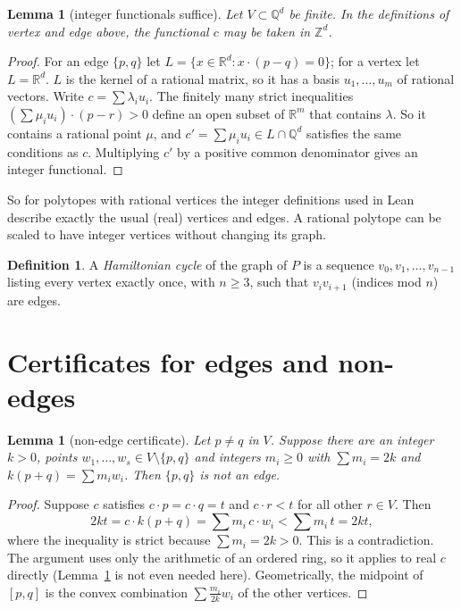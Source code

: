 \documentclass[11pt]{article}
\newtheorem{lemma}[theorem]{Lemma}
\theoremstyle{definition}
\newtheorem{definition}[theorem]{Definition}
\theoremstyle{remark}
\begin{document}
\begin{lemma}[integer functionals suffice]\label{lem:int}
Let $V\subset\mathbb{Q}^d$ be finite. In the definitions of vertex and edge above,
the functional $c$ may be taken in $\mathbb{Z}^d$.
\end{lemma}
\begin{proof}
For an edge $\{p,q\}$ let $L=\{x\in\mathbb{R}^d: x\cdot(p-q)=0\}$; for a vertex let
$L=\mathbb{R}^d$. $L$ is the kernel of a rational matrix, so it has a basis
$u_1,\dots,u_m$ of rational vectors. Write $c=\sum\lambda_iu_i$. The finitely many
strict inequalities $(\sum\mu_iu_i)\cdot(p-r)>0$ define an open subset of
$\mathbb{R}^m$ that contains $\lambda$. So it contains a rational point $\mu$, and
$c'=\sum\mu_iu_i\in L\cap\mathbb{Q}^d$ satisfies the same conditions as $c$.
Multiplying $c'$ by a positive common denominator gives an integer functional.
\end{proof}
So for polytopes with rational vertices the integer definitions used in Lean
describe exactly the usual (real) vertices and edges. A rational polytope can be
scaled to have integer vertices without changing its graph.

\begin{definition}
A \emph{Hamiltonian cycle} of the graph of $P$ is a sequence
$v_0,v_1,\dots,v_{n-1}$ listing every vertex exactly once, with $n\ge3$, such that
$v_i v_{i+1}$ (indices mod $n$) are edges.
\end{definition}

\section{Certificates for edges and non-edges}
\begin{lemma}[non-edge certificate]\label{lem:cert}
Let $p\ne q$ in $V$. Suppose there are an integer $k>0$, points
$w_1,\dots,w_s\in V\setminus\{p,q\}$ and integers $m_i\ge0$ with
$\sum m_i=2k$ and $k(p+q)=\sum m_iw_i$. Then $\{p,q\}$ is not an edge.
\end{lemma}
\begin{proof}
Suppose $c$ satisfies $c\cdot p=c\cdot q=t$ and $c\cdot r<t$ for all other
$r\in V$. Then
\[2kt=c\cdot k(p+q)=\sum m_i\,c\cdot w_i<\sum m_i\,t=2kt,\]
where the inequality is strict because $\sum m_i=2k>0$. This is a contradiction. The
argument uses only the arithmetic of an ordered ring, so it applies to real $c$
directly (Lemma~\ref{lem:int} is not even needed here). Geometrically, the
midpoint of $[p,q]$ is the convex combination $\sum\frac{m_i}{2k}w_i$ of the
other vertices.
\end{proof}
\end{document}
